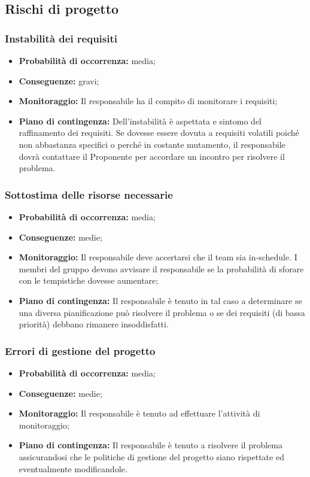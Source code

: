 \subsection{Rischi di progetto}
\subsubsection{Instabilità dei requisiti}
\begin{itemize}
\item \textbf{Probabilità di occorrenza:} media;
\item \textbf{Conseguenze:} gravi;
\item \textbf{Monitoraggio:} Il responsabile ha il compito di monitorare i requisiti;
\item \textbf{Piano di contingenza:} Dell'instabilità è aspettata e sintomo del raffinamento dei requisiti.	Se dovesse essere dovuta a requisiti volatili poiché non abbastanza specifici o perché in costante mutamento, il responsabile dovrà contattare il Proponente per accordare un incontro per risolvere il problema.
\end{itemize}
\subsubsection{Sottostima delle risorse necessarie}
\begin{itemize}
\item \textbf{Probabilità di occorrenza:} media;
\item \textbf{Conseguenze:} medie;
\item \textbf{Monitoraggio:} Il responsabile deve accertarsi che il team sia in-schedule. I membri del gruppo devono avvisare il responsabile se la probabilità di sforare con le tempistiche dovesse aumentare;
\item \textbf{Piano di contingenza:} Il responsabile è tenuto in tal caso a determinare se una diversa pianificazione può risolvere il problema o se dei requisiti (di bassa priorità) debbano rimanere insoddisfatti.
\end{itemize}
\subsubsection{Errori di gestione del progetto}
\begin{itemize}
\item \textbf{Probabilità di occorrenza:} media;
\item \textbf{Conseguenze:} medie;
\item \textbf{Monitoraggio:} Il responsabile è tenuto ad effettuare l'attività di monitoraggio;
\item \textbf{Piano di contingenza:} Il responsabile è tenuto a risolvere il problema assicurandosi che le politiche di gestione del progetto siano rispettate ed eventualmente modificandole.
\end{itemize}
\pagebreak